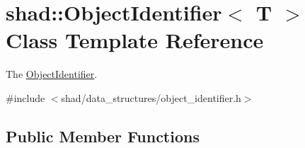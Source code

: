 \hypertarget{classshad_1_1ObjectIdentifier}{\section{shad\-:\-:Object\-Identifier$<$ T $>$ Class Template Reference}
\label{classshad_1_1ObjectIdentifier}
}


The \hyperlink{classshad_1_1ObjectIdentifier}{Object\-Identifier}.  




{\ttfamily \#include $<$shad/data\-\_\-structures/object\-\_\-identifier.\-h$>$}

\subsection*{Public Member Functions}
